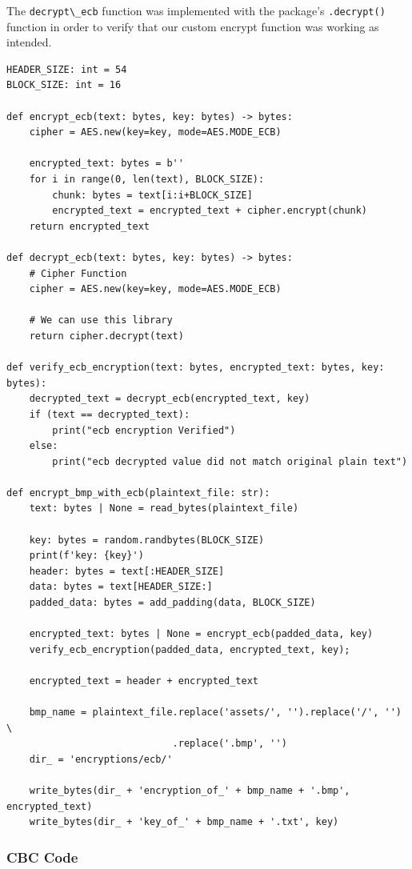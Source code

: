 \documentclass[11pt]{article}
\begin{document}
The \verb|decrypt\_ecb| function was implemented with the package's \verb|.decrypt()| function in order to verify that our custom encrypt function was working as intended.

\begin{framed}
\begin{verbatim}
HEADER_SIZE: int = 54
BLOCK_SIZE: int = 16

def encrypt_ecb(text: bytes, key: bytes) -> bytes:
    cipher = AES.new(key=key, mode=AES.MODE_ECB)

    encrypted_text: bytes = b''
    for i in range(0, len(text), BLOCK_SIZE):
        chunk: bytes = text[i:i+BLOCK_SIZE]
        encrypted_text = encrypted_text + cipher.encrypt(chunk)
    return encrypted_text 

def decrypt_ecb(text: bytes, key: bytes) -> bytes:
    # Cipher Function
    cipher = AES.new(key=key, mode=AES.MODE_ECB)
    
    # We can use this library
    return cipher.decrypt(text)

def verify_ecb_encryption(text: bytes, encrypted_text: bytes, key: bytes):
    decrypted_text = decrypt_ecb(encrypted_text, key)
    if (text == decrypted_text):
        print("ecb encryption Verified")
    else:
        print("ecb decrypted value did not match original plain text")

def encrypt_bmp_with_ecb(plaintext_file: str):
    text: bytes | None = read_bytes(plaintext_file)

    key: bytes = random.randbytes(BLOCK_SIZE)
    print(f'key: {key}')
    header: bytes = text[:HEADER_SIZE]
    data: bytes = text[HEADER_SIZE:]
    padded_data: bytes = add_padding(data, BLOCK_SIZE)

    encrypted_text: bytes | None = encrypt_ecb(padded_data, key)
    verify_ecb_encryption(padded_data, encrypted_text, key);

    encrypted_text = header + encrypted_text

    bmp_name = plaintext_file.replace('assets/', '').replace('/', '') \
                             .replace('.bmp', '')
    dir_ = 'encryptions/ecb/'

    write_bytes(dir_ + 'encryption_of_' + bmp_name + '.bmp', encrypted_text)
    write_bytes(dir_ + 'key_of_' + bmp_name + '.txt', key)
\end{verbatim}
\end{framed}

\subsubsection*{CBC Code}
\end{document}
